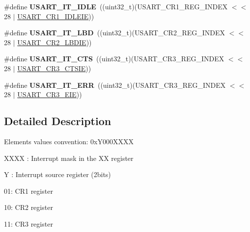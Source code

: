 \begin{DoxyCompactItemize}
\item 
\#define {\bfseries U\+S\+A\+R\+T\+\_\+\+I\+T\+\_\+\+I\+D\+LE}~((uint32\+\_\+t)(U\+S\+A\+R\+T\+\_\+\+C\+R1\+\_\+\+R\+E\+G\+\_\+\+I\+N\+D\+EX $<$$<$ 28 $\vert$ \hyperlink{group___peripheral___registers___bits___definition_ga5221d09eebd12445a20f221bf98066f8}{U\+S\+A\+R\+T\+\_\+\+C\+R1\+\_\+\+I\+D\+L\+E\+IE}))\hypertarget{group___u_s_a_r_t___interrupt__definition_ga5d85aab24b7b2dfddb61ba2a49fa6185}{}\label{group___u_s_a_r_t___interrupt__definition_ga5d85aab24b7b2dfddb61ba2a49fa6185}

\item 
\#define {\bfseries U\+S\+A\+R\+T\+\_\+\+I\+T\+\_\+\+L\+BD}~((uint32\+\_\+t)(U\+S\+A\+R\+T\+\_\+\+C\+R2\+\_\+\+R\+E\+G\+\_\+\+I\+N\+D\+EX $<$$<$ 28 $\vert$ \hyperlink{group___peripheral___registers___bits___definition_gaa02ef5d22553f028ea48e5d9f08192b4}{U\+S\+A\+R\+T\+\_\+\+C\+R2\+\_\+\+L\+B\+D\+IE}))\hypertarget{group___u_s_a_r_t___interrupt__definition_ga063628e16cdda199b07d380421afc4a5}{}\label{group___u_s_a_r_t___interrupt__definition_ga063628e16cdda199b07d380421afc4a5}

\item 
\#define {\bfseries U\+S\+A\+R\+T\+\_\+\+I\+T\+\_\+\+C\+TS}~((uint32\+\_\+t)(U\+S\+A\+R\+T\+\_\+\+C\+R3\+\_\+\+R\+E\+G\+\_\+\+I\+N\+D\+EX $<$$<$ 28 $\vert$ \hyperlink{group___peripheral___registers___bits___definition_ga636d5ec2e9556949fc68d13ad45a1e90}{U\+S\+A\+R\+T\+\_\+\+C\+R3\+\_\+\+C\+T\+S\+IE}))\hypertarget{group___u_s_a_r_t___interrupt__definition_gab49efbefaca2921e8cbe8f5146e99dbd}{}\label{group___u_s_a_r_t___interrupt__definition_gab49efbefaca2921e8cbe8f5146e99dbd}

\item 
\#define {\bfseries U\+S\+A\+R\+T\+\_\+\+I\+T\+\_\+\+E\+RR}~((uint32\+\_\+t)(U\+S\+A\+R\+T\+\_\+\+C\+R3\+\_\+\+R\+E\+G\+\_\+\+I\+N\+D\+EX $<$$<$ 28 $\vert$ \hyperlink{group___peripheral___registers___bits___definition_gaaed1a39c551b1641128f81893ff558d0}{U\+S\+A\+R\+T\+\_\+\+C\+R3\+\_\+\+E\+IE}))\hypertarget{group___u_s_a_r_t___interrupt__definition_ga631e83efd4c4789128d80a9539faf78a}{}\label{group___u_s_a_r_t___interrupt__definition_ga631e83efd4c4789128d80a9539faf78a}

\end{DoxyCompactItemize}


\subsection{Detailed Description}
Elements values convention\+: 0x\+Y000\+X\+X\+XX
\begin{DoxyItemize}
\item X\+X\+XX \+: Interrupt mask in the XX register
\item Y \+: Interrupt source register (2bits)
\begin{DoxyItemize}
\item 01\+: C\+R1 register
\item 10\+: C\+R2 register
\item 11\+: C\+R3 register 
\end{DoxyItemize}
\end{DoxyItemize}